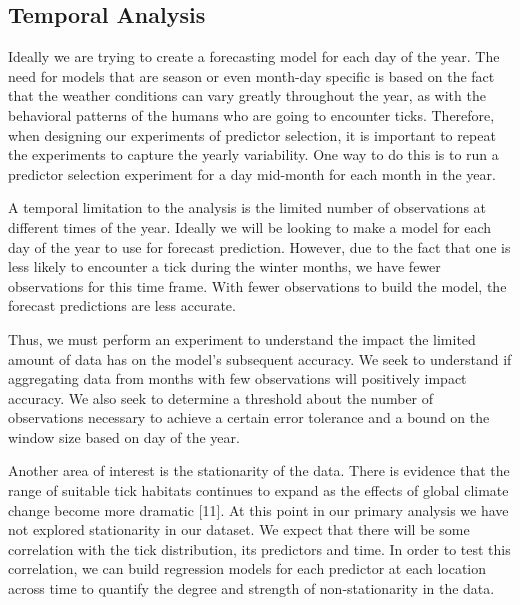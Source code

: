 \subsection{Temporal Analysis}
Ideally we are trying to create a forecasting model for each day of the year. The need for models that are season or even month-day specific is based on the fact that the weather conditions can vary greatly throughout the year, as with the behavioral patterns of the humans who are going to encounter ticks. Therefore, when designing our experiments of predictor selection, it is important to repeat the experiments to capture the yearly variability. One way to do this is to run a predictor selection experiment for a day mid-month for each month in the year. \newline

\noindent A temporal limitation to the analysis is the limited number of observations at different times of the year. Ideally we will be looking to make a model for each day of the year to use for forecast prediction. However, due to the fact that one is less likely to encounter a tick during the winter months, we have fewer observations for this time frame. With fewer observations to build the model, the forecast predictions are less accurate. \newline 

\noindent Thus, we must perform an experiment to understand the impact the limited amount of data has on the model's subsequent accuracy. We seek to understand if aggregating data from months with few observations will positively impact accuracy. We also seek to determine a threshold about the number of observations necessary to achieve a certain error tolerance and a bound on the window size based on day of the year. \newline

\noindent Another area of interest is the stationarity of the data. There is evidence that the range of suitable tick habitats continues to expand as the effects of global climate change become more dramatic [11]. At this point in our primary analysis we have not explored stationarity in our dataset. We expect that there will be some correlation with the tick distribution, its predictors and time. In order to test this correlation, we can build regression models for each predictor at each location across time to quantify the degree and strength of non-stationarity in the data.  \newline



